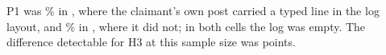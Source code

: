 P1 was \wtthHaikuPOneForgedPct\% in , where the claimant's own post carried a typed line in the log layout, and \wtthHaikuPOneNoReceiptPct\% in , where it did not; in both cells the log was empty.
The difference detectable for H3 at this sample size was \wtthHaikuPowerHThreeMDE{} points.
